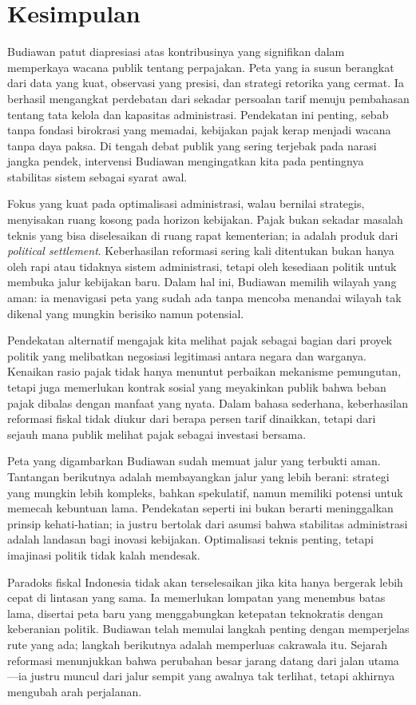 \section{Kesimpulan}
\label{sec:Kesimpulan}
Budiawan patut diapresiasi atas kontribusinya yang signifikan dalam memperkaya wacana publik tentang perpajakan. Peta yang ia susun berangkat dari data yang kuat, observasi yang presisi, dan strategi retorika yang cermat. Ia berhasil mengangkat perdebatan dari sekadar persoalan tarif menuju pembahasan tentang tata kelola dan kapasitas administrasi. Pendekatan ini penting, sebab tanpa fondasi birokrasi yang memadai, kebijakan pajak kerap menjadi wacana tanpa daya paksa. Di tengah debat publik yang sering terjebak pada narasi jangka pendek, intervensi Budiawan mengingatkan kita pada pentingnya stabilitas sistem sebagai syarat awal.

Fokus yang kuat pada optimalisasi administrasi, walau bernilai strategis, menyisakan ruang kosong pada horizon kebijakan. Pajak bukan sekadar masalah teknis yang bisa diselesaikan di ruang rapat kementerian; ia adalah produk dari \textit{political settlement}. Keberhasilan reformasi sering kali ditentukan bukan hanya oleh rapi atau tidaknya sistem administrasi, tetapi oleh kesediaan politik untuk membuka jalur kebijakan baru. Dalam hal ini, Budiawan memilih wilayah yang aman: ia menavigasi peta yang sudah ada tanpa mencoba menandai wilayah tak dikenal yang mungkin berisiko namun potensial.

Pendekatan alternatif mengajak kita melihat pajak sebagai bagian dari proyek politik yang melibatkan negosiasi legitimasi antara negara dan warganya. Kenaikan rasio pajak tidak hanya menuntut perbaikan mekanisme pemungutan, tetapi juga memerlukan kontrak sosial yang meyakinkan publik bahwa beban pajak dibalas dengan manfaat yang nyata. Dalam bahasa sederhana, keberhasilan reformasi fiskal tidak diukur dari berapa persen tarif dinaikkan, tetapi dari sejauh mana publik melihat pajak sebagai investasi bersama.

Peta yang digambarkan Budiawan sudah memuat jalur yang terbukti aman. Tantangan berikutnya adalah membayangkan jalur yang lebih berani: strategi yang mungkin lebih kompleks, bahkan spekulatif, namun memiliki potensi untuk memecah kebuntuan lama. Pendekatan seperti ini bukan berarti meninggalkan prinsip kehati-hatian; ia justru bertolak dari asumsi bahwa stabilitas administrasi adalah landasan bagi inovasi kebijakan. Optimalisasi teknis penting, tetapi imajinasi politik tidak kalah mendesak.

Paradoks fiskal Indonesia tidak akan terselesaikan jika kita hanya bergerak lebih cepat di lintasan yang sama. Ia memerlukan lompatan yang menembus batas lama, disertai peta baru yang menggabungkan ketepatan teknokratis dengan keberanian politik. Budiawan telah memulai langkah penting dengan memperjelas rute yang ada; langkah berikutnya adalah memperluas cakrawala itu. Sejarah reformasi menunjukkan bahwa perubahan besar jarang datang dari jalan utama—ia justru muncul dari jalur sempit yang awalnya tak terlihat, tetapi akhirnya mengubah arah perjalanan.

\clearpage